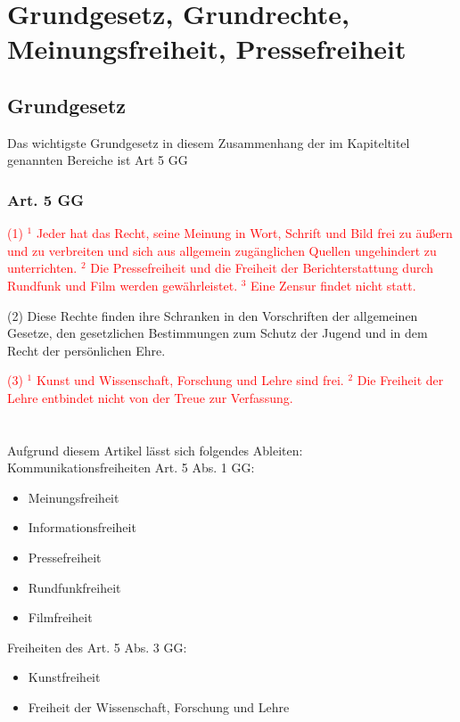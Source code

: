 \chapter{Grundgesetz, Grundrechte, Meinungsfreiheit, Pressefreiheit}
\section{Grundgesetz}
Das wichtigste Grundgesetz in diesem Zusammenhang der im Kapiteltitel genannten Bereiche ist Art 5 GG
\subsection{Art. 5 GG}

\textcolor{red}{(1) $^1$ Jeder hat das Recht, seine Meinung in Wort, Schrift und Bild frei zu
äußern und zu verbreiten und sich aus allgemein zugänglichen Quellen
ungehindert zu unterrichten. $^2$ Die Pressefreiheit und die Freiheit der
Berichterstattung durch Rundfunk und Film werden gewährleistet. $^3$ Eine
Zensur findet nicht statt.}

(2) Diese Rechte finden ihre Schranken in den Vorschriften der allgemeinen
Gesetze, den gesetzlichen Bestimmungen zum Schutz der Jugend und in
dem Recht der persönlichen Ehre.

\textcolor{red}{(3) $^1$ Kunst und Wissenschaft, Forschung und Lehre sind frei. $^2$  Die Freiheit der Lehre entbindet nicht von der Treue zur Verfassung.}
\qquad\\
\qquad\\
\qquad\\
Aufgrund diesem Artikel lässt sich folgendes Ableiten:\\
Kommunikationsfreiheiten Art. 5 Abs. 1 GG:
\begin{itemize}
         \item Meinungsfreiheit
         \item Informationsfreiheit
         \item Pressefreiheit
         \item Rundfunkfreiheit
         \item Filmfreiheit
\end{itemize}

Freiheiten des Art. 5 Abs. 3 GG:
\begin{itemize}
	\item Kunstfreiheit
	\item Freiheit der Wissenschaft, Forschung und Lehre
\end{itemize}

